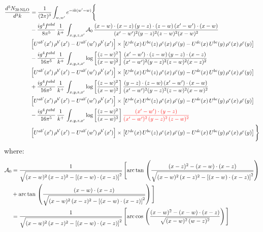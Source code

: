 \documentclass[9pt]{article}
\numberwithin{equation}{section}
\newcommand{\chg}[1]{{\color{red}#1}}
\begin{document}
\begin{align}
\frac{d^{3}N_{3b\,\rm NLO}}{d^{3}k} & = \frac{1}{(2\pi)^{3}}\int_{w,w'}e^{-ik(w'-w)}\Bigg\{\notag \\
&-\frac{ig^{4}f^{abd}}{8\pi^{5}}\,\frac{1}{k^{+}}\,\int_{x,y,z,x'}\mathcal{A}_{0}\,
\frac{(x-w)\cdot(x-z)\,(y-z)\cdot(z-w)\,(x'-w')\cdot(x-w)}{(x'-w')^{2}(y-z)^{2}(z-w)^{2}(x-w)^{2}}\notag \\ & \left[U^{ab'}(x')\,\rho^{b'}(x')-U^{ab'}(w')\, \rho^{b'}(x')\right]\times \left[U^{de}(x)\,U^{bc}(z)\, \rho^{e}(x)\,\rho^{c}(y)-U^{de}(x)\,U^{bc}(y)\,\rho^{e}(x)\,\rho^{c}(y)\right] \notag \\
& -\frac{ig^{4}f^{abd}}{16\pi^{5}}\,\frac{1}{k^{+}}\,\int_{x,y,z,x'}\log{\left[\frac{(z-w)^{2}}{(x-w)^{2}}\right]}\,
\frac{(x'-w')\cdot(z-w)\,(y-z)\cdot(x-z)}{(x'-w')^{2}(y-z)^{2}(z-w)^{2}(x-z)^{2}}\notag \\
&\left[U^{ab'}(x')\,\rho^{b'}(x')-U^{ab'}(w')\, \rho^{b'}(x')\right]\times \left[U^{de}(x)\,U^{bc}(z)\, \rho^{e}(x)\,\rho^{c}(y)-U^{de}(x)\,U^{bc}(y)\,\rho^{e}(x)\,\rho^{c}(y)\right] \notag \\
&+ \frac{ig^{4}f^{abd}}{16\pi^{5}}\,\frac{1}{k^{+}}\,\int_{x,y,z,x'}\log{\left[\frac{(z-w)^{2}}{(x-w)^{2}}\right]}\,
\frac{(y-z)\cdot(z-w)\,(x'-w')\cdot(x-w)}{(x'-w')^{2}(y-z)^{2}(z-w)^{2}(x-w)^{2}}\notag \\ 
& \left[U^{ab'}(x')\,\rho^{b'}(x')-U^{ab'}(w')\, \rho^{b'}(x')\right]\times \left[U^{de}(x)\,U^{bc}(z)\, \rho^{e}(x)\,\rho^{c}(y)-U^{de}(x)\,U^{bc}(y)\,\rho^{e}(x)\,\rho^{c}(y)\right]\notag \\ & -\frac{ig^{4}f^{abd}}{16\pi^{5}}\,\frac{1}{k^{+}}\,\int_{x,y,z,x'}\log{\left[\frac{(z-w)^{2}}{(x-w)^{2}}\right]}\,\chg{\frac{(x'-w')\cdot(y-z)}{(x'-w')^{2}\,(y-z)^{2}\,(z-w)^{2}}}\notag \\ & \left[U^{ab'}(x')\,\rho^{b'}(x')-U^{ab'}(w')\, \rho^{b'}(x')\right]\times \left[U^{de}(x)\,U^{bc}(z)\, \rho^{e}(x)\,\rho^{c}(y)-U^{de}(x)\,U^{bc}(y)\,\rho^{e}(x)\,\rho^{c}(y)\right]\Bigg\}
\end{align}
where: \begin{align}
\mathcal{A}_{0} & = \frac{1}{\sqrt{(x-w)^{2}\,(x-z)^{2}-\left[(x-w)\cdot (x-z)\right]^{2}}}\, \Bigg[\mathrm{arc\,tan}\,\left(\frac{(x-z)^{2}-(x-w)\cdot (x-z)}{\sqrt{(x-w)^{2}\,(x-z)^{2}-\left[(x-w)\cdot (x-z)\right]^{2}}}\right)\notag \\ & + \mathrm{arc\,tan}\,\left(\frac{(x-w)\cdot (x-z)}{\sqrt{(x-w)^{2}\,(x-z)^{2}-\left[(x-w)\cdot (x-z)\right]^{2}}}\right) \Bigg]\notag \\ & = \frac{1}{\sqrt{(x-w)^{2}\,(x-z)^{2}-\left[(x-w)\cdot (x-z)\right]^{2}}}\, \Bigg[\mathrm{arc\,cos}\,\left(\frac{(x-w)^{2}-(x-w)\cdot (x-z)}{\sqrt{(x-w)^{2}\,(w-z)^{2}}}\right)\Bigg]
\end{align}
\end{document}
